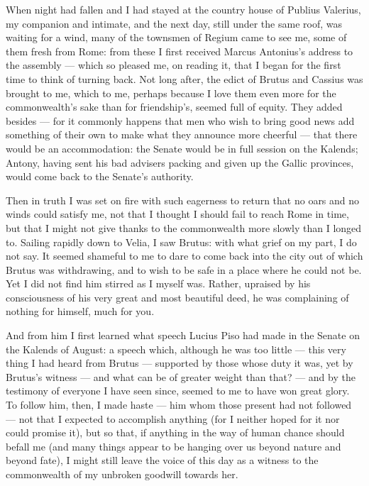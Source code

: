  When night had fallen and I had stayed at the country house of Publius Valerius, my companion and intimate, and the next day, still under the same roof, was waiting for a wind, many of the townsmen of Regium came to see me, some of them fresh from Rome: from these I first received Marcus Antonius's address to the assembly --- which so pleased me, on reading it, that I began for the first time to think of turning back. Not long after, the edict of Brutus and Cassius was brought to me, which to me, perhaps because I love them even more for the commonwealth's sake than for friendship's, seemed full of equity. They added besides --- for it commonly happens that men who wish to bring good news add something of their own to make what they announce more cheerful --- that there would be an accommodation: the Senate would be in full session on the Kalends; Antony, having sent his bad advisers packing and given up the Gallic provinces, would come back to the Senate's authority.

 Then in truth I was set on fire with such eagerness to return that no oars and no winds could satisfy me, not that I thought I should fail to reach Rome in time, but that I might not give thanks to the commonwealth more slowly than I longed to. Sailing rapidly down to Velia, I saw Brutus: with what grief on my part, I do not say. It seemed shameful to me to dare to come back into the city out of which Brutus was withdrawing, and to wish to be safe in a place where he could not be. Yet I did not find him stirred as I myself was. Rather, upraised by his consciousness of his very great and most beautiful deed, he was complaining of nothing for himself, much for you.

 And from him I first learned what speech Lucius Piso had made in the Senate on the Kalends of August: a speech which, although he was too little --- this very thing I had heard from Brutus --- supported by those whose duty it was, yet by Brutus's witness --- and what can be of greater weight than that? --- and by the testimony of everyone I have seen since, seemed to me to have won great glory. To follow him, then, I made haste --- him whom those present had not followed --- not that I expected to accomplish anything (for I neither hoped for it nor could promise it), but so that, if anything in the way of human chance should befall me (and many things appear to be hanging over us beyond nature and beyond fate), I might still leave the voice of this day as a witness to the commonwealth of my unbroken goodwill towards her.

